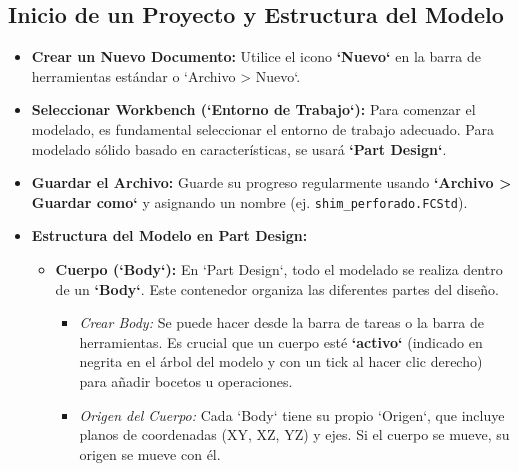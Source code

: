 \documentclass[12pt]{article}
\begin{document}
\subsection{Inicio de un Proyecto y Estructura del Modelo}
\begin{itemize}[label=\textbullet]
    \item \textbf{Crear un Nuevo Documento:} Utilice el icono \textbf{`Nuevo`} en la barra de herramientas estándar o `Archivo > Nuevo`.
    \item \textbf{Seleccionar Workbench (`Entorno de Trabajo`):} Para comenzar el modelado, es fundamental seleccionar el entorno de trabajo adecuado. Para modelado sólido basado en características, se usará \textbf{`Part Design`}.
    \item \textbf{Guardar el Archivo:} Guarde su progreso regularmente usando \textbf{`Archivo > Guardar como`} y asignando un nombre (ej. \texttt{shim\_perforado.FCStd}).
    \item \textbf{Estructura del Modelo en Part Design:}
    \begin{itemize}[label=\textendash]
        \item \textbf{Cuerpo (`Body`):} En `Part Design`, todo el modelado se realiza dentro de un \textbf{`Body`}. Este contenedor organiza las diferentes partes del diseño.
        \begin{itemize}[label=\textendash]
            \item \textit{Crear Body:} Se puede hacer desde la barra de tareas o la barra de herramientas. Es crucial que un cuerpo esté \textbf{`activo`} (indicado en negrita en el árbol del modelo y con un tick al hacer clic derecho) para añadir bocetos u operaciones.
            \item \textit{Origen del Cuerpo:} Cada `Body` tiene su propio `Origen`, que incluye planos de coordenadas (XY, XZ, YZ) y ejes. Si el cuerpo se mueve, su origen se mueve con él.
        \end{itemize}
    \end{itemize}
\end{itemize}
\end{document}
